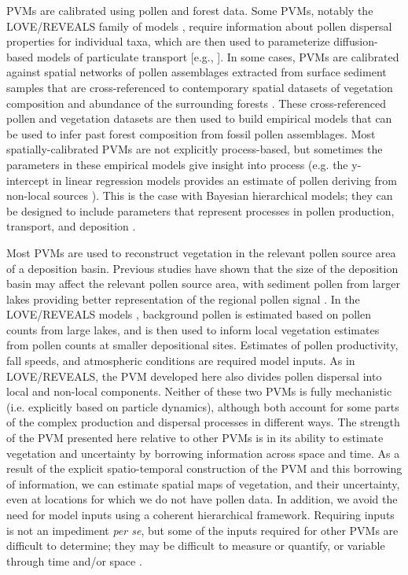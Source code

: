 \documentclass[12pt]{article}
\begin{document}
PVMs are calibrated using pollen and forest data. Some PVMs, notably
the LOVE/REVEALS family of models \citep{sugita2007theory1,
  sugita2007theory2}, require information about pollen dispersal
properties for individual taxa, which are then used to parameterize
diffusion-based models of particulate transport [e.g.,
\citet{prentice1985pollen}]. In some cases, PVMs are calibrated
against spatial networks of pollen assemblages extracted from surface
sediment samples that are cross-referenced to contemporary spatial
datasets of vegetation composition and abundance of the surrounding
forests \citep{sugita2007theory1, sugita2007theory2}. These
cross-referenced pollen and vegetation datasets are then used to build
empirical models that can be used to infer past forest composition
from fossil pollen assemblages. Most spatially-calibrated PVMs are not
explicitly process-based, but sometimes the parameters in these
empirical models give insight into process (e.g. the y-intercept in
linear regression models provides an estimate of pollen deriving from
non-local sources \citep{howe1983calibrating}).  This is the case with
Bayesian hierarchical models; they can be designed to include
parameters that represent processes in pollen production, transport,
and deposition \citep{paciorek2009mapping}. 

Most PVMs are used to reconstruct vegetation in the relevant pollen
source area of a deposition basin. Previous studies have shown that
the size of the deposition basin may affect the relevant pollen source
area, with sediment pollen from larger lakes providing better
representation of the regional pollen signal
\citep{jacobson1981selection, sugita1994pollen, sugita2007theory1}. In
the LOVE/REVEALS models \citep{sugita2007theory1, sugita2007theory2},
background pollen is estimated based on pollen counts from large
lakes, and is then used to inform local vegetation estimates from
pollen counts at smaller depositional sites. Estimates of pollen
productivity, fall speeds, and atmospheric conditions are required
model inputs. As in LOVE/REVEALS, the PVM developed here also divides
pollen dispersal into local and non-local components. Neither of these
two PVMs is fully mechanistic (i.e. explicitly based on particle
dynamics), although both account for some parts of the complex
production and dispersal processes in different ways. The strength of
the PVM presented here relative to other PVMs is in its ability to
estimate vegetation and uncertainty by borrowing information across
space and time. As a result of the explicit spatio-temporal
construction of the PVM and this borrowing of information, we can
estimate spatial maps of vegetation, and their uncertainty, even at
locations for which we do not have pollen data. In addition, we avoid
the need for model inputs using a coherent hierarchical
framework. Requiring inputs is not an impediment \textit{per se}, but
some of the inputs required for other PVMs are difficult to determine;
they may be difficult to measure or quantify, or variable through time
and/or space \citep{jackson1999pollen}.
\end{document}
